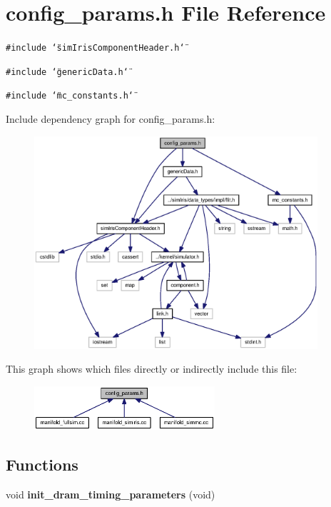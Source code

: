 \section{config\_\-params.h File Reference}
\label{config__params_8h}
{\tt \#include \char`\"{}simIrisComponentHeader.h\char`\"{}}\par
{\tt \#include \char`\"{}genericData.h\char`\"{}}\par
{\tt \#include \char`\"{}mc\_\-constants.h\char`\"{}}\par


Include dependency graph for config\_\-params.h:\nopagebreak
\begin{figure}[H]
\begin{center}
\leavevmode
\includegraphics[width=298pt]{config__params_8h__incl}
\end{center}
\end{figure}


This graph shows which files directly or indirectly include this file:\nopagebreak
\begin{figure}[H]
\begin{center}
\leavevmode
\includegraphics[width=190pt]{config__params_8h__dep__incl}
\end{center}
\end{figure}
\subsection*{Functions}
\begin{CompactItemize}
\item 
void {\bf init\_\-dram\_\-timing\_\-parameters} (void)
\end{CompactItemize}
